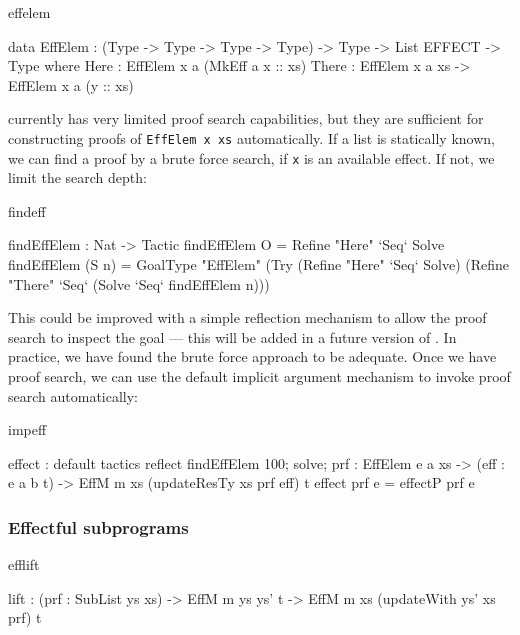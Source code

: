 \begin{SaveVerbatim}{effelem}

data EffElem : (Type -> Type -> Type -> Type) -> 
               Type -> List EFFECT -> Type where
     Here : EffElem x a (MkEff a x :: xs)
     There : EffElem x a xs -> EffElem x a (y :: xs)

\end{SaveVerbatim}

\Idris{} currently has very limited proof search capabilities, but they
are sufficient for constructing proofs of \texttt{EffElem x xs} automatically.
If a list is statically known, we can find a proof
by a brute force search, if \texttt{x} is an available effect. If not, we limit
the search depth:

\begin{SaveVerbatim}{findeff}

findEffElem : Nat -> Tactic 
findEffElem O = Refine "Here" `Seq` Solve 
findEffElem (S n) = GoalType "EffElem" 
      (Try (Refine "Here" `Seq` Solve)
           (Refine "There" `Seq` 
                   (Solve `Seq` findEffElem n)))

\end{SaveVerbatim}

\noindent
This could be improved with a simple reflection mechanism to allow the proof
search to inspect the goal --- this will be added in a future version of \Idris{}.
In practice, we have found the brute force approach to be adequate. Once we
have proof search, we can use the default implicit argument mechanism to
invoke proof search automatically:

\begin{SaveVerbatim}{impeff}

effect : {default tactics { 
                     reflect findEffElem 100; 
                     solve; 
                  } 
            prf : EffElem e a xs} -> 
         (eff : e a b t) -> 
         EffM m xs (updateResTy xs prf eff) t
effect {prf} e = effectP prf e

\end{SaveVerbatim}

\subsubsection*{Effectful subprograms}

\begin{SaveVerbatim}{efflift}

lift : (prf : SubList ys xs) ->
       EffM m ys ys' t -> 
       EffM m xs (updateWith ys' xs prf) t

\end{SaveVerbatim}


